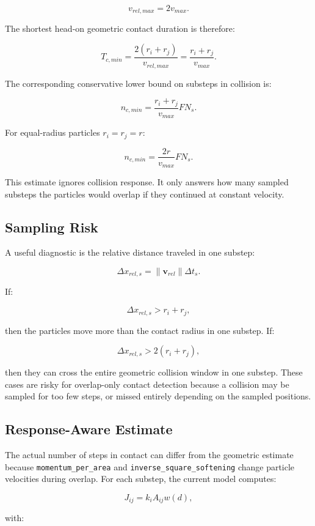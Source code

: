 \documentclass[11pt]{article}
\begin{document}
\[
    v_{rel,max}=2v_{max}.
\]

The shortest head-on geometric contact duration is therefore:

\[
    T_{c,min}
    =
    \frac{2(r_i+r_j)}{v_{rel,max}}
    =
    \frac{r_i+r_j}{v_{max}}.
\]

The corresponding conservative lower bound on substeps in collision is:

\[
    n_{c,min}
    =
    \frac{r_i+r_j}{v_{max}} F N_s.
\]

For equal-radius particles \(r_i=r_j=r\):

\[
    n_{c,min}
    =
    \frac{2r}{v_{max}} F N_s.
\]

This estimate ignores collision response. It only answers how many sampled
substeps the particles would overlap if they continued at constant velocity.

\subsection{Sampling Risk}

A useful diagnostic is the relative distance traveled in one substep:

\[
    \Delta x_{rel,s}
    =
    \|\mathbf{v}_{rel}\|\Delta t_s.
\]

If:

\[
    \Delta x_{rel,s} > r_i+r_j,
\]

then the particles move more than the contact radius in one substep. If:

\[
    \Delta x_{rel,s} > 2(r_i+r_j),
\]

then they can cross the entire geometric collision window in one substep. These
cases are risky for overlap-only contact detection because a collision may be
sampled for too few steps, or missed entirely depending on the sampled
positions.

\subsection{Response-Aware Estimate}

The actual number of steps in contact can differ from the geometric estimate
because \texttt{momentum\_per\_area} and
\texttt{inverse\_square\_softening} change particle velocities during overlap.
For each substep, the current model computes:

\[
    J_{ij}
    =
    k_i A_{ij} w(d),
\]

with:
\end{document}
